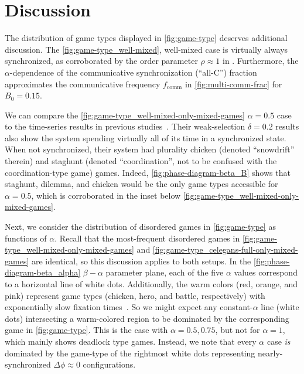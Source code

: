 \documentclass[pdflatex,lineno,referee,sn-nature]{sn-jnl}
\begin{document}
\section{Discussion}\label{sec:discussion}

The distribution of game types displayed in \cref{fig:game-type}
deserves additional discussion.
The \cref{fig:game-type_well-mixed},
well-mixed case
is virtually always synchronized,
as corroborated by the order parameter $\rho \approx 1$ in
.
Furthermore,
the $\alpha$-dependence of the
communicative synchronization (``all-C'') fraction
approximates the communicative frequency $f_{\text{comm}}$
in \cref{fig:multi-comm-frac} for $B_0=0.15$.

We can compare the \cref{fig:game-type_well-mixed-only-mixed-games}
$\alpha = 0.5$ case
to the time-series results
in previous studies~\citep{tripp2022evolutionary}.
Their weak-selection $\delta = 0.2$
results also show the system spending
virtually all of its time in a synchronized state.
When not synchronized, their system had plurality
chicken (denoted ``snowdrift'' therein)
and staghunt (denoted ``coordination'',
not to be confused with the coordination-type game) games.
Indeed, \cref{fig:phase-diagram-beta_B}
shows that staghunt, dilemma, and chicken
would be the only game types accessible for $\alpha = 0.5$,
which is corroborated in the inset below
\cref{fig:game-type_well-mixed-only-mixed-games}.

Next, we consider the distribution of disordered games
in \cref{fig:game-type} as functions of $\alpha$.
Recall that the most-frequent disordered games
in \cref{fig:game-type_well-mixed-only-mixed-games}
and \cref{fig:game-type_celegans-full-only-mixed-games} are identical,
so this discussion applies to both setups.
In the \cref{fig:phase-diagram-beta_alpha}
$\beta-\alpha$ parameter plane,
each of the five $\alpha$ values
correspond to a horizontal line of white dots.
Additionally, the warm colors (red, orange, and pink)
represent game types (chicken, hero, and battle, respectively)
with exponentially slow fixation times~\citep{antal2006fixation}.
So we might expect any constant-$\alpha$ line (white dots) intersecting
a warm-colored region
to be dominated by the corresponding game in \cref{fig:game-type}.
This is the case with $\alpha = 0.5, 0.75$,
but not for $\alpha = 1$,
which mainly shows deadlock type games.
Instead, we note that every $\alpha$ case \emph{is} dominated
by the game-type of the rightmost white dots
representing nearly-synchronized $\Delta \phi \approx 0$ configurations.
\end{document}
